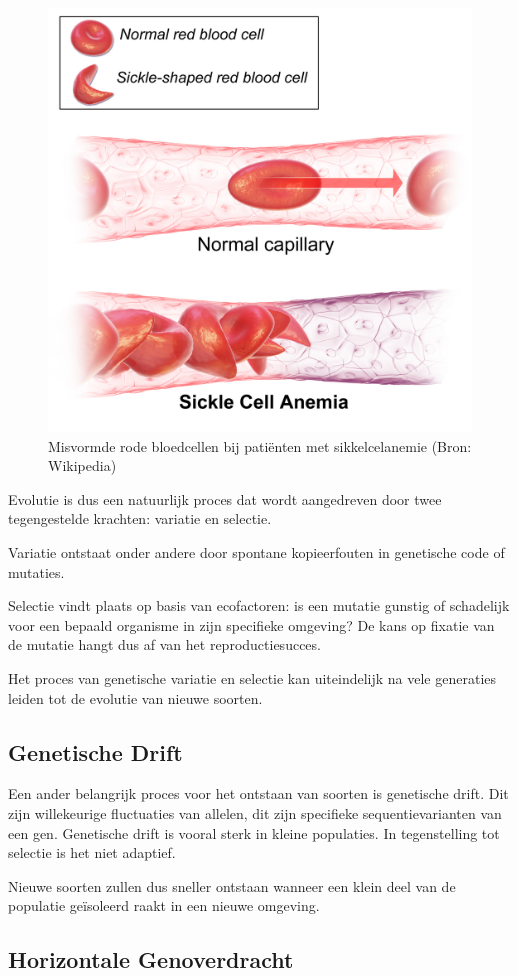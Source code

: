 \documentclass[
  11pt,
]{book}
\begin{document}
\begin{figure}

{\centering \includegraphics[width=0.45\linewidth]{./figs/Sickle_Cell_Anemia_wiki3} 

}

\caption{Misvormde rode bloedcellen bij patiënten met sikkelcelanemie (Bron: Wikipedia)}\label{fig:sickleCell2}
\end{figure}

Evolutie is dus een natuurlijk proces dat wordt aangedreven door twee tegengestelde krachten: variatie en selectie.

Variatie ontstaat onder andere door spontane kopieerfouten in genetische code of mutaties.

Selectie vindt plaats op basis van ecofactoren: is een mutatie gunstig of schadelijk voor een bepaald organisme in zijn specifieke omgeving? De kans op fixatie van de mutatie hangt dus af van het reproductiesucces.

Het proces van genetische variatie en selectie kan uiteindelijk na vele generaties leiden tot de evolutie van nieuwe soorten.

\hypertarget{genetische-drift}{%
\subsection{Genetische Drift}\label{genetische-drift}}

Een ander belangrijk proces voor het ontstaan van soorten is genetische drift. Dit zijn willekeurige fluctuaties van allelen, dit zijn specifieke sequentievarianten van een gen. Genetische drift is vooral sterk in kleine populaties. In tegenstelling tot selectie is het niet adaptief.

Nieuwe soorten zullen dus sneller ontstaan wanneer een klein deel van de populatie geïsoleerd raakt in een nieuwe omgeving.

\hypertarget{horizontale-genoverdracht}{%
\subsection{Horizontale Genoverdracht}\label{horizontale-genoverdracht}}
\end{document}
